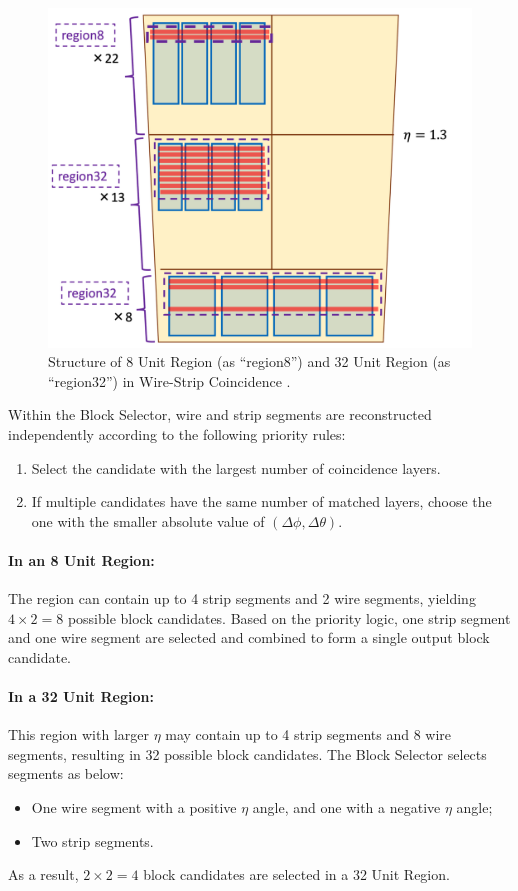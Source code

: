 \begin{figure}[htbp]
  \centering
  \includegraphics[width=1.0\textwidth]{figs/chapter5/wsc_region_new.png}
  \caption{Structure of 8 Unit Region (as ``region8'') and 32 Unit Region (as ``region32'') in Wire-Strip Coincidence \cite{yamashita}.}
  \label{fig:wsc_region}
\end{figure}

Within the Block Selector, wire and strip segments are reconstructed independently according to the following priority rules:
\begin{enumerate}
  \item Select the candidate with the largest number of coincidence layers.
  \item If multiple candidates have the same number of matched layers, choose the one with the smaller absolute value of \((\Delta\phi, \Delta\theta)\).
\end{enumerate}

\paragraph{In an 8 Unit Region:}  
The region can contain up to 4 strip segments and 2 wire segments, yielding $4 \times 2 = 8$ possible block candidates. Based on the priority logic, one strip segment and one wire segment are selected and combined to form a single output block candidate.

\paragraph{In a 32 Unit Region:}  
This region with larger $\eta$ may contain up to 4 strip segments and 8 wire segments, resulting in 32 possible block candidates. The Block Selector selects segments as below:
\begin{itemize}
  \item One wire segment with a positive $\eta$ angle, and one with a negative $\eta$ angle;
  \item Two strip segments.
\end{itemize}
As a result, $2 \times 2 = 4$ block candidates are selected in a 32 Unit Region.

